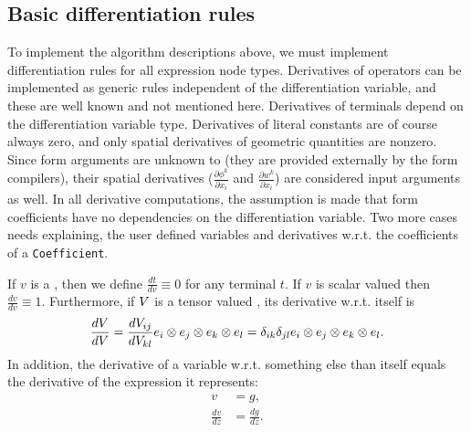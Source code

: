 \subsection{Basic differentiation rules}

To implement the algorithm descriptions above, we must implement
differentiation rules for all expression node types. Derivatives
of operators can be implemented as generic rules independent of the
differentiation variable, and these are well known and not mentioned
here. Derivatives of terminals depend on the differentiation variable
type.  Derivatives of literal constants are of course always zero,
and only spatial derivatives of geometric quantities are nonzero.
Since form arguments are unknown to \ufl{} (they are provided externally
by the form compilers), their spatial derivatives ($\frac{\partial
  \phi^k}{\partial x_i}$ and $\frac{\partial w^k}{\partial x_i}$) are
considered input arguments as well.  In all derivative computations,
the assumption is made that form coefficients have no dependencies
on the differentiation variable.  Two more cases needs explaining,
the user defined variables and derivatives w.r.t. the coefficients of
a \texttt{Coefficient}.

If $v$ is a , then we define $\frac{d t}{d v} \equiv 0$
for any terminal $t$. If $v$ is scalar valued then $\frac{d v}{d v}
\equiv 1$. Furthermore, if ${V}$ is a tensor valued ,
its derivative w.r.t. itself is
\begin{align}
\frac{d {V}}{d {V}}
    =
    \frac{d V_{ij}}{d V_{kl}}
    {e}_i\otimes{e}_j\otimes{e}_k\otimes{e}_l
    =
    \delta_{ik}\delta_{jl}
    {e}_i\otimes{e}_j\otimes{e}_k\otimes{e}_l .
\end{align}
In addition, the derivative of a variable w.r.t. something else than
itself equals the derivative of the expression it represents:
\begin{align}
v &= g, \\
\frac{d v}{d z} &= \frac{d g}{d z}.
\end{align}

